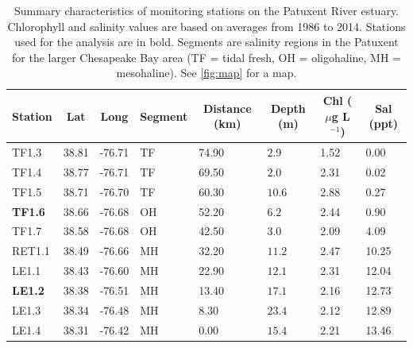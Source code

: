 \documentclass[letterpaper,12pt,oneside]{article}\usepackage[]{graphicx}\usepackage[]{color}
\newcommand{\mugl}{$\mu$g L$^{-1}$}
\begin{document}
\begin{table}[!tbp]
\caption{Summary characteristics of monitoring stations on the Patuxent River estuary.  Chlorophyll and salinity values are based on averages from 1986 to 2014.  Stations used for the analysis are in bold.  Segments are salinity regions in the Patuxent for the larger Chesapeake Bay area (TF = tidal fresh, OH = oligohaline, MH = mesohaline).  See \cref{fig:map} for a map.\label{tab:statsum}} 
\begin{center}
\begin{tabular}{llllllll}
\hline\hline
\multicolumn{1}{l}{Station}&\multicolumn{1}{c}{Lat}&\multicolumn{1}{c}{Long}&\multicolumn{1}{c}{Segment}&\multicolumn{1}{c}{Distance (km)}&\multicolumn{1}{c}{Depth (m)}&\multicolumn{1}{c}{Chl (\mugl)}&\multicolumn{1}{c}{Sal (ppt)}\tabularnewline
\hline
TF1.3&38.81&-76.71&TF&74.90&$ 2.9$&1.52& 0.00\tabularnewline
TF1.4&38.77&-76.71&TF&69.50&$ 2.0$&2.31& 0.02\tabularnewline
TF1.5&38.71&-76.70&TF&60.30&$10.6$&2.88& 0.27\tabularnewline
{\bf TF1.6}&38.66&-76.68&OH&52.20&$ 6.2$&2.44& 0.90\tabularnewline
TF1.7&38.58&-76.68&OH&42.50&$ 3.0$&2.09& 4.09\tabularnewline
RET1.1&38.49&-76.66&MH&32.20&$11.2$&2.47&10.25\tabularnewline
LE1.1&38.43&-76.60&MH&22.90&$12.1$&2.31&12.04\tabularnewline
{\bf LE1.2}&38.38&-76.51&MH&13.40&$17.1$&2.16&12.73\tabularnewline
LE1.3&38.34&-76.48&MH& 8.30&$23.4$&2.12&12.89\tabularnewline
LE1.4&38.31&-76.42&MH& 0.00&$15.4$&2.21&13.46\tabularnewline
\hline
\end{tabular}\end{center}

\end{table}




\end{document}
